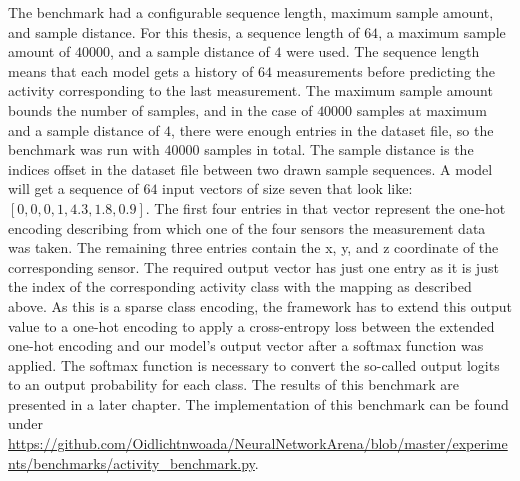 \documentclass[draft,final]{vutinfth} %
\begin{document}
The benchmark had a configurable sequence length, maximum sample amount, and sample distance.
For this thesis, a sequence length of $64$, a maximum sample amount of $40000$, and a sample distance of $4$ were used.
The sequence length means that each model gets a history of $64$ measurements before predicting the activity corresponding to the last measurement.
The maximum sample amount bounds the number of samples, and in the case of $40000$ samples at maximum and a sample distance of $4$, there were enough entries in the dataset file, so the benchmark was run with $40000$ samples in total.
The sample distance is the indices offset in the dataset file between two drawn sample sequences.
A model will get a sequence of $64$ input vectors of size seven that look like: $[0,0,0,1,4.3,1.8,0.9]$.
The first four entries in that vector represent the one-hot encoding describing from which one of the four sensors the measurement data was taken.
The remaining three entries contain the x, y, and z coordinate of the corresponding sensor.
The required output vector has just one entry as it is just the index of the corresponding activity class with the mapping as described above.
As this is a sparse class encoding, the framework has to extend this output value to a one-hot encoding to apply a cross-entropy loss between the extended one-hot encoding and our model's output vector after a softmax function was applied.
The softmax function is necessary to convert the so-called output logits to an output probability for each class.
The results of this benchmark are presented in a later chapter.
The implementation of this benchmark can be found under \url{https://github.com/Oidlichtnwoada/NeuralNetworkArena/blob/master/experiments/benchmarks/activity_benchmark.py}.
\end{document}
